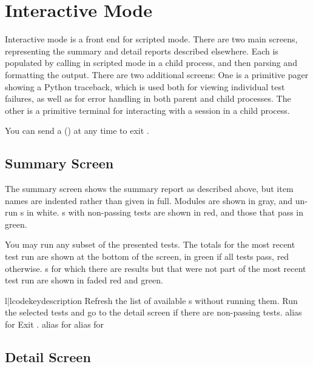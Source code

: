 \chapter{Interactive Mode \label{interactive}}

Interactive mode is a front end for scripted mode. There are two main screens,
representing the summary and detail reports described elsewhere. Each is
populated by calling  in scripted mode in a child process,
and then parsing and formatting the output. There are two additional screens:
One is a primitive pager showing a Python traceback, which is used both for
viewing individual test failures, as well as for error handling in both parent
and child processes. The other is a primitive terminal for interacting with a
 session in a child process.

You can send a  () at any time to exit
.


\section{Summary Screen \label{summary}}

The summary screen shows the summary report as described above, but item names
are indented rather than given in full. Modules are shown in gray, and un-run
s in white. s with non-passing tests are shown in red, and those
that pass in green.

You may run any subset of the presented tests. The totals for the most recent
test run are shown at the bottom of the screen, in green if all tests pass, red
otherwise. s for which there are results but that were not part of the
most recent test run are shown in faded red and green.

\begin{tableii}{l|l}{code}{key}{description}
    {Refresh the list of available s without running them.}
    {Run the selected tests and go to the detail screen if there are non-passing
    tests.}
    {alias for }
    {Exit .}
    {alias for }
    {alias for }
\end{tableii}


\section{Detail Screen \label{detail}}


